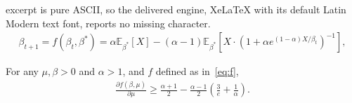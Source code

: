 \documentclass[10pt,a4paper]{amsart}
\begin{document}
excerpt is pure ASCII, so the delivered engine, XeLaTeX with its default Latin Modern text font, reports no missing character.
\begin{align}
  \label{eq:f}
\beta_{t+1}
  = f(\beta_t, \beta^*)
  = \alpha \mathbb{E}_{\beta^*}[X]
  - (\alpha - 1)\mathbb{E}_{\beta^*}[X \cdot (1+\alpha e^{(1-\alpha)X / \beta_t})^{-1}],
\end{align}

\begin{lem}\label{lem:partial_deriv}
  For any $\mu, \beta>0$ and $\alpha >1$, and $f$ defined as in~\ref{eq:f},
  \begin{align*}
    \frac{\partial f(\beta,\mu)}{\partial \mu} \geq \frac{\alpha+1}{2} -
    \frac{\alpha-1}{2}\left(\frac{3}{e} + \frac{1}{\alpha} \right).
  \end{align*}
\end{lem}
\end{document}
